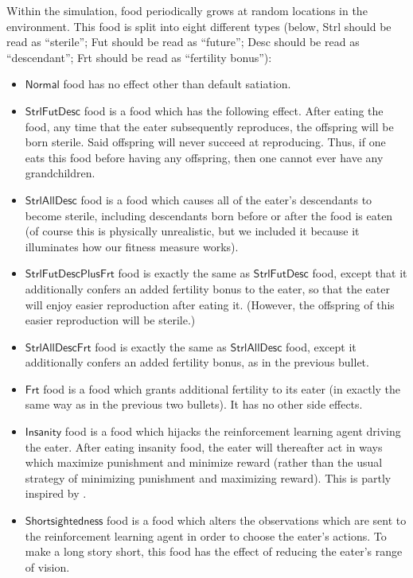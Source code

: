 \documentclass{article}
\begin{document}
Within the simulation, food periodically grows at random locations in the
environment. This food is split into eight different types (below, Strl should
be read as ``sterile''; Fut should be read as ``future'';
Desc should be read as ``descendant'';
Frt should be read as ``fertility bonus''):
\begin{itemize}
    \item $\mathsf{Normal}$ food has no effect other than default satiation.
    \item $\mathsf{StrlFutDesc}$ food is a food which has the
        following effect. After eating the food, any time that the eater
        subsequently reproduces, the offspring will be born sterile.
        Said offspring will never succeed at reproducing. Thus, if one eats
        this food before having
        any offspring, then one cannot ever have any grandchildren.
    \item $\mathsf{StrlAllDesc}$ food is a food which causes
        all of the eater's descendants to become sterile, including
        descendants born before or after the food is eaten (of course
        this is physically unrealistic, but we included it because
        it illuminates how our fitness measure works).
    \item $\mathsf{StrlFutDescPlusFrt}$ food is exactly the same
        as $\mathsf{StrlFutDesc}$ food, except that it additionally
        confers an added fertility bonus to the eater, so that the eater
        will enjoy easier reproduction after eating it. (However, the offspring
        of this easier reproduction will be sterile.)
    \item $\mathsf{StrlAllDescFrt}$ food is exactly the same
        as $\mathsf{StrlAllDesc}$ food, except it additionally confers an
        added fertility bonus, as in the previous bullet.
    \item $\mathsf{Frt}$ food is a food which grants additional fertility to
        its eater (in exactly the same way as in the previous two bullets).
        It has no other side effects.
    \item $\mathsf{Insanity}$ food is a food which hijacks the
        reinforcement learning
        agent driving the eater. After eating insanity food, the eater will
        thereafter act in ways which maximize punishment and minimize reward
        (rather than the usual strategy of minimizing punishment and
        maximizing reward). This is partly inspired by \cite{alexander2021reward}.
    \item $\mathsf{Shortsightedness}$ food is a food which alters the observations
        which are sent to the reinforcement learning agent in order to choose
        the eater's actions. To make a long story short, this food has the
        effect of reducing the eater's range of vision.
\end{itemize}
\end{document}
